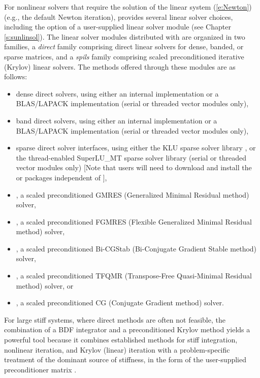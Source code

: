 For nonlinear solvers that require the solution of the linear system
(\ref{e:Newton}) (e.g., the default Newton iteration), {\cvodes} provides several
linear solver choices, including the option of a user-supplied linear solver
module (see Chapter \ref{s:sunlinsol}). The linear solver modules distributed
with {\sundials} are organized in two families, a {\em direct} family comprising
direct linear solvers for dense, banded, or sparse matrices, and a {\em spils}
family comprising scaled preconditioned iterative (Krylov) linear solvers.
The methods offered through these modules are as follows:
\begin{itemize}
\item dense direct solvers, using either an internal implementation or
  a BLAS/LAPACK implementation (serial or threaded vector modules only),
\item band direct solvers, using either an internal implementation or
  a BLAS/LAPACK implementation (serial or threaded vector modules only),
\item sparse direct solver interfaces, using either the KLU sparse solver
  library \cite{DaPa:10,KLU_site}, or the thread-enabled SuperLU\_MT sparse
  solver library \cite{Li:05,DGL:99,SuperLUMT_site} (serial or threaded
  vector modules only) [Note that users will need to download and install the
  {\klu} or {\superlumt} packages independent of {\cvodes}],
\item {\spgmr}, a scaled preconditioned GMRES (Generalized Minimal Residual method)
  solver,
\item {\spfgmr}, a scaled preconditioned FGMRES (Flexible Generalized
  Minimal Residual method) solver,
\item {\spbcg}, a scaled preconditioned Bi-CGStab (Bi-Conjugate Gradient Stable
  method) solver,
\item {\sptfqmr}, a scaled preconditioned TFQMR (Transpose-Free Quasi-Minimal
  Residual method) solver, or
\item {\pcg}, a scaled preconditioned CG (Conjugate Gradient method) solver.
\end{itemize}
For large stiff systems, where direct methods are often not feasible, the
combination of a BDF integrator and a preconditioned Krylov
method yields a powerful tool
because it combines established methods for stiff integration,
nonlinear iteration, and Krylov (linear) iteration with a
problem-specific treatment of the dominant source of stiffness, in the
form of the user-supplied preconditioner matrix \cite{BrHi:89}.


